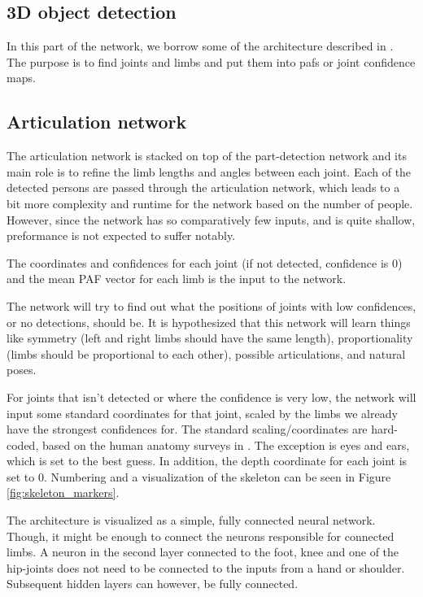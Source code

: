 \subsection{3D object detection}\label{subsec:obj_detect}
In this part of the network, we borrow some of the architecture described in \cite{cao2017realtime}. The purpose is to find joints and limbs and put them into \gls{paf}s or joint confidence maps. 

\subsection{Articulation network}\label{subsec:articulation}
The articulation network is stacked on top of the part-detection network and its main role is to refine the limb lengths and angles between each joint. Each of the detected persons are passed through the articulation network, which leads to a bit more complexity and runtime for the network based on the number of people. However, since the network has so comparatively few inputs, and is quite shallow, preformance is not expected to suffer notably.

The coordinates and confidences for each joint (if not detected, confidence is 0) and the mean PAF vector for each limb is the input to the network.

The network will try to find out what the positions of joints with low confidences, or no detections, should be. It is hypothesized that this network will learn things like symmetry (left and right limbs should have the same length), proportionality (limbs should be proportional to each other), possible articulations, and natural poses.

For joints that isn't detected or where the confidence is very low, the network will input some standard coordinates for that joint, scaled by the limbs we already have the strongest confidences for. The standard scaling/coordinates are hard-coded, based on the human anatomy surveys in \cite{bodySegmentParams}. The exception is eyes and ears, which is set to the best guess. In addition, the depth coordinate for each joint is set to 0. Numbering and a visualization of the skeleton can be seen in Figure \ref{fig:skeleton_markers}.

The architecture is visualized as a simple, fully connected neural network. Though, it might be enough to connect the neurons responsible for connected limbs. A neuron in the second layer connected to the foot, knee and one of the hip-joints does not need to be connected to the inputs from a hand or shoulder. Subsequent hidden layers can however, be fully connected.

